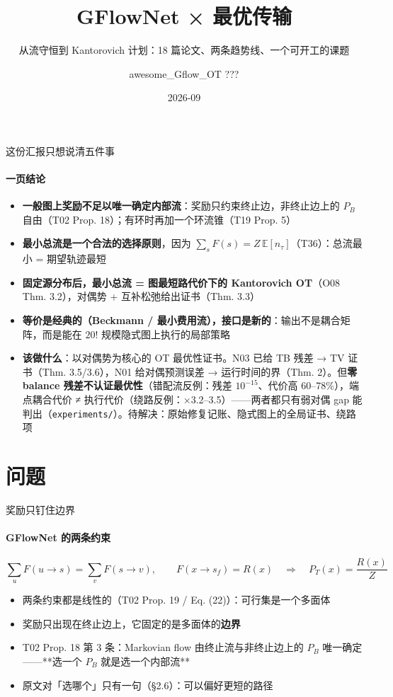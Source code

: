 \documentclass[aspectratio=169,10pt]{beamer}
\title{GFlowNet × 最优传输}
\subtitle{从流守恒到 Kantorovich 计划：18 篇论文、两条趋势线、一个可开工的课题}
\author{awesome\_Gflow\_OT ???}
\institute{github.com/asimfish/awesome\_Gflow\_OT}
\date{2026-09}
\newcommand{\HL}[1]{\textcolor{emphasis}{#1}}
\begin{document}
\maketitle
\begin{frame}{这份汇报只想说清五件事}\framesubtitle{一页结论}
\begin{itemize}\small
\item \textbf{一般图上奖励不足以唯一确定内部流}：奖励只约束终止边，非终止边上的 $P_B$ 自由（T02 Prop. 18）；有环时再加一个环流锥（T19 Prop. 5）
\item \textbf{最小总流是一个合法的选择原则}，因为 $\sum_s F(s)=Z\,\mathbb E[n_\tau]$（T36）：总流最小 = 期望轨迹最短
\item \textbf{固定源分布后，最小总流 = 图最短路代价下的 Kantorovich OT}（O08 Thm. 3.2），对偶势 + 互补松弛给出证书（Thm. 3.3）
\item \textbf{等价是经典的（Beckmann / 最小费用流），接口是新的}：输出不是耦合矩阵，而是能在 $20!$ 规模隐式图上执行的局部策略
\item \textbf{该做什么}：\HL{以对偶势为核心的 OT 最优性证书}。N03 已给 TB 残差 → TV 证书（Thm. 3.5/3.6），N01 给对偶预测误差 → 运行时间的界（Thm. 2）。但\textbf{零 balance 残差不认证最优性}（错配流反例：残差 $10^{-15}$、代价高 60–78\%），端点耦合代价 ≠ 执行代价（绕路反例：×3.2–3.5）——两者都只有弱对偶 gap 能判出（\texttt{experiments/}）。待解决：原始修复记账、隐式图上的全局证书、绕路项
\end{itemize}
\end{frame}

\section{问题}

\begin{frame}{奖励只钉住边界}\framesubtitle{GFlowNet 的两条约束}
\begin{equation*}\sum_{u}F(u\to s)=\sum_{v}F(s\to v),\qquad F(x\to s_f)=R(x)\quad\Longrightarrow\quad P_T(x)=\frac{R(x)}{Z}\end{equation*}
\begin{itemize}\small
\item 两条约束都是线性的（T02 Prop. 19 / Eq. (22)）：可行集是一个多面体
\item 奖励只出现在终止边上，它固定的是多面体的\textbf{边界}
\item T02 Prop. 18 第 3 条：Markovian flow 由终止流与非终止边上的 $P_B$ 唯一确定——**选一个 $P_B$ 就是选一个内部流**
\item 原文对「选哪个」只有一句（§2.6）：可以偏好更短的路径
\end{itemize}
\end{frame}
\end{document}
